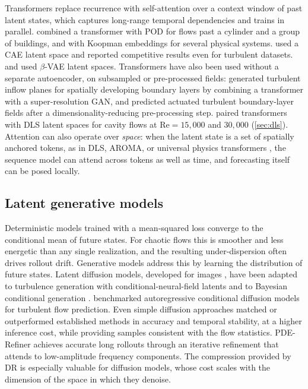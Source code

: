 Transformers \parencite{vaswani2017attention} replace recurrence with
self-attention over a context window of past latent states, which captures
long-range temporal dependencies and trains in parallel.
\textcite{wu2022transformer} combined a transformer with POD for flows past a
cylinder and a group of buildings, and \textcite{geneva2022transformers} with
Koopman embeddings for several physical systems. \textcite{hemmasian2023transformers}
used a CAE latent space and reported competitive results even for turbulent
datasets. \textcite{solera2024betavae} and \textcite{wang2024optimal} used
$\beta$-VAE latent spaces. Transformers have also been used without a
separate autoencoder, on subsampled or pre-processed fields:
\textcite{yousif2023transformer} generated turbulent inflow planes for
spatially developing boundary layers by combining a transformer with a
super-resolution GAN, and \textcite{sarma2024tbl} predicted actuated turbulent
boundary-layer fields after a dimensionality-reducing pre-processing step.
\textcite{morton2026scitech} paired transformers with DLS latent spaces for
cavity flows at $\mathrm{Re}=15{,}000$ and $30{,}000$
(\cref{sec:dls}). Attention can also operate over \emph{space}: when the latent
state is a set of spatially anchored tokens, as in DLS, AROMA, or universal
physics transformers
\parencite{deshmukh2020dls,serrano2024aroma,alkin2024upt}, the sequence model can
attend across tokens as well as time, and forecasting itself can be posed
locally.

\subsection{Latent generative models}

Deterministic models trained with a mean-squared loss converge to the
conditional mean of future states. For chaotic flows this is smoother and less
energetic than any single realization, and the resulting under-dispersion
often drives rollout drift. Generative models address this by learning the
distribution of future states. Latent diffusion models, developed for images
\parencite{rombach2022ldm}, have been adapted to turbulence generation with
conditional-neural-field latents \parencite{du2024cnf} and to Bayesian
conditional generation \parencite{gao2024bayesian}. \textcite{kohl2023acdm}
benchmarked autoregressive conditional diffusion models for turbulent flow
prediction. Even simple diffusion approaches matched or outperformed
established methods in accuracy and temporal stability, at a higher inference
cost, while providing samples consistent with the flow statistics. PDE-Refiner
\parencite{lippe2023pderefiner} achieves accurate long rollouts through an
iterative refinement that attends to low-amplitude frequency components. The
compression provided by DR is especially valuable for diffusion models, whose
cost scales with the dimension of the space in which they denoise.

